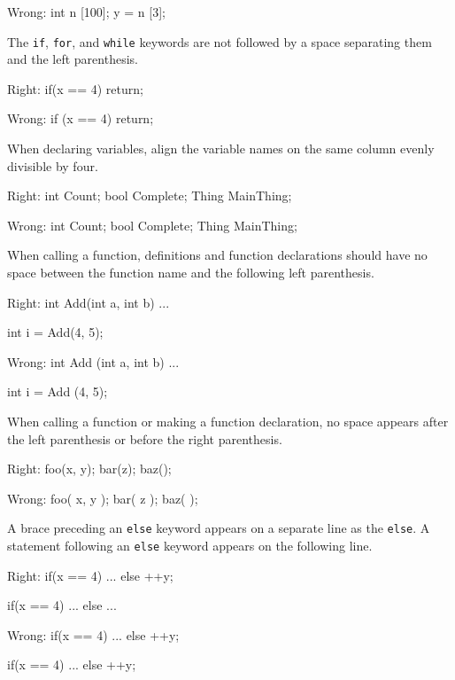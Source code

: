 Wrong:
\startCodeExample
int n [100];
y = n [3];
\stopCodeExample

\item
The {\tt if}, {\tt for}, and {\tt while} keywords are not followed by a space separating them and the left parenthesis. 

Right:
\startCodeExample
if(x == 4)
    return;
\stopCodeExample

Wrong:
\startCodeExample
if (x == 4)
    return;
\stopCodeExample

\item
When declaring variables, align the variable names on the same column evenly divisible by four.

Right:
\startCodeExample
int     Count;
bool    Complete;
Thing   MainThing;
\stopCodeExample

Wrong:
\startCodeExample
int Count;
bool Complete;
Thing MainThing;
\stopCodeExample

\item
When calling a function, definitions and function declarations should have no space between the function name and the following left parenthesis.

Right:
\startCodeExample
int Add(int a, int b)
{ 
    ... 
}

int i = Add(4, 5);
\stopCodeExample

Wrong:
\startCodeExample
int Add (int a, int b)
{
    ...
}

int i = Add (4, 5);
\stopCodeExample

\item
When calling a function or making a function declaration, no space appears after the left parenthesis or before the right parenthesis.

Right:
\startCodeExample
foo(x, y);
bar(z);
baz();
\stopCodeExample

Wrong:
\startCodeExample
foo( x, y );
bar( z );
baz( );
\stopCodeExample

\item
A brace preceding an {\tt else} keyword appears on a separate line as the {\tt else}. A statement following an {\tt else} keyword appears on the following line. 

Right:
\startCodeExample
if(x == 4)
{
    ...
}
else
  ++y;

if(x == 4)
{
    ...
}
else
{
    ...
}
\stopCodeExample

Wrong:
\startCodeExample
if(x == 4) {
    ...
}
else ++y;

if(x == 4) {
    ...
} else ++y;

